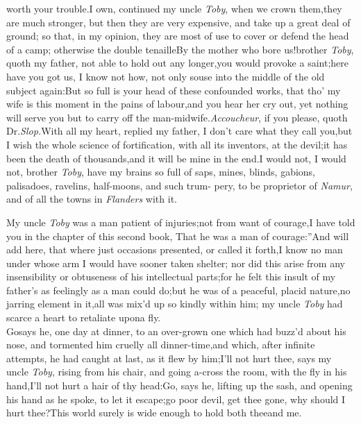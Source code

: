 \documentclass{article}
\begin{document}
worth your trouble.\tsh I own, continued my uncle \textit{Toby},
when we crown them,\tsk they are much stronger, but
then they are very expensive, and take up a great deal of
ground; so that,\break
in my opinion, they are most of use to\break
cover or defend the head of a camp;\break
otherwise the double tenaille\tsh By\break
the mother who bore us!\tsh brother
\textit{Toby}, quoth my father, not able to hold out any
longer,\tsk you would provoke a saint;\tsk here have you
got us, I know not how, not only souse into the middle of
the old subject again:\tsk But so full is your head of these
confounded works, that tho’ my wife is this moment in the
pains of labour,\tsk and you hear her cry out,\tsk\break
yet nothing will serve you but to carry\break
off the man-midwife.\tsh \textit{Accoucheur},\tsk\break
if you please, quoth Dr.\@ \textit{Slop.}\tsk With all 
my heart, replied my father, I don’t care
what they call you,\tsk but I wish the whole
science of fortification, with all its inventors, at the
devil;\tsk it has been the death of thousands,\tsk and it
will be mine in the end.\tsk I would not, I would not,
brother \textit{Toby}, have my brains so full of saps,
mines, blinds, gabions, palisadoes, ravelins, half-moons,
and such trum-
pery, to be proprietor of \textit{Namur}, and of\break
all the towns in \textit{Flanders} with it.

My uncle \textit{Toby} was a man patient of injuries;\tsk not
from want of courage,\tsk I have told you in the chapter of
this\break
second book, \lqq That he was a man of\break
\lqq courage:”\tsk And will add here, that where just
occasions presented, or called it forth,\tsk I know no man
under whose arm I would have sooner taken shelter;\break
nor did this arise from any insensibility or obtuseness of
his intellectual parts;\tsk\break for he felt this insult of my
father’s as feelingly as a man could do;\tsk but he was of a
peaceful, placid nature,\tsk no\break
jarring element in it,\tsk all was mix’d up\break
so kindly within him; my uncle \textit{Toby}\break
had scarce a heart to retaliate upon\break a fly.\\
\newpage
\tsk Go\tsk says he, one day at dinner, to an over-grown one
which had buzz’d about his nose, and tormented him cruelly all
dinner-time,\tsk and which, after infinite attempts, he had caught
at last, as it flew by him;\tsk I’ll not hurt thee,
says my uncle \textit{Toby}, rising from his chair, and
going a-cross
the room, with the fly in his hand,\tsk I’ll not hurt a
hair of thy head:\tsk Go, says he, lifting up the sash, and
opening his hand as he spoke, to let it escape;\tsk go poor
devil, get thee gone, why should I hurt thee?\tsh This
world surely is wide enough to hold both thee\break and me.
\end{document}
